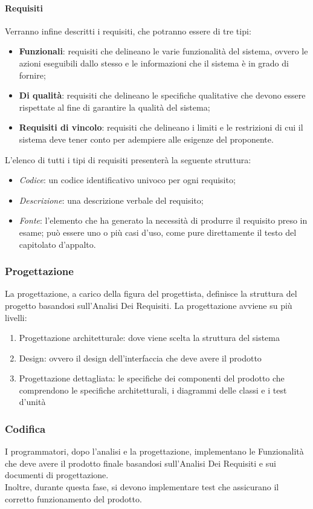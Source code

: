 \paragraph{Requisiti} 
Verranno infine descritti i requisiti, che potranno essere di tre tipi: 
\begin{itemize}
    \item \textbf{Funzionali}: requisiti che delineano le varie funzionalità del sistema, ovvero le azioni eseguibili dallo stesso e le informazioni che il sistema è in grado di fornire; 
    \item \textbf{Di qualità}: requisiti che delineano le specifiche qualitative che devono essere rispettate al fine di garantire la qualità del sistema; 
    \item \textbf{Requisiti di vincolo}: requisiti che delineano i limiti e le restrizioni di cui il sistema deve tener conto per adempiere alle esigenze del proponente. 
\end{itemize}
L'elenco di tutti i tipi di requisiti presenterà la seguente struttura: 
\begin{itemize}
    \item \textit{Codice}: un codice identificativo univoco per ogni requisito; 
    \item \textit{Descrizione}: una descrizione verbale del requisito; 
    \item \textit{Fonte}: l'elemento che ha generato la necessità di produrre il requisito preso in esame; può essere uno o più casi d'uso, come pure direttamente il testo del capitolato d'appalto. 
\end{itemize}
\subsubsection{Progettazione}
La progettazione, a carico della figura del progettista, definisce la struttura del progetto basandosi sull'Analisi Dei Requisiti.
La progettazione avviene su più livelli:
\begin{enumerate}
    \item Progettazione architetturale: dove viene scelta la struttura del sistema
    \item Design: ovvero il design dell'interfaccia che deve avere il prodotto
    \item Progettazione dettagliata: le specifiche dei componenti del prodotto che comprendono le specifiche architetturali, i diagrammi delle classi e i test d'unità
\end{enumerate}
\subsubsection{Codifica}
I programmatori, dopo l'analisi e la progettazione, implementano le Funzionalità che deve avere il prodotto finale basandosi sull'Analisi Dei Requisiti e sui documenti di progettazione.\\
Inoltre, durante questa fase, si devono implementare test che assicurano il corretto funzionamento del prodotto.
